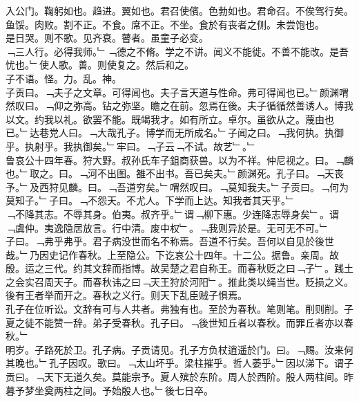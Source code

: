 \documentclass{zhvt-classic}
\begin{document}
\hspace*{2em}入公门。鞠躬如也。趋进。翼如也。君召使儐。色勃如也。君命召。不俟驾行矣。\\
\hspace*{2em}鱼馁。肉败。割不正。不食。席不正。不坐。食於有丧者之侧。未尝饱也。\\
\hspace*{2em}是日哭。则不歌。见齐衰。瞽者。虽童子必变。\\
\hspace*{2em}﹁三人行。必得我师。﹂﹁德之不脩。学之不讲。闻义不能徙。不善不能改。是吾忧也。﹂使人歌。善。则使复之。然后和之。\\
\hspace*{2em}子不语。怪。力。乱。神。\\
\hspace*{2em}子贡曰。﹁夫子之文章。可得闻也。夫子言天道与性命。弗可得闻也已。﹂颜渊喟然叹曰。﹁仰之弥高。钻之弥坚。瞻之在前。忽焉在後。夫子循循然善诱人。博我以文。约我以礼。欲罢不能。既竭我才。如有所立。卓尔。虽欲从之。蔑由也已。﹂达巷党人曰。﹁大哉孔子。博学而无所成名。﹂子闻之曰。﹁我何执。执御乎。执射乎。我执御矣。﹂牢曰。﹁子云﹁不试。故艺﹂。﹂\\
\hspace*{2em}鲁哀公十四年春。狩大野。叔孙氏车子鉏商获兽。以为不祥。仲尼视之。曰。﹁麟也。﹂取之。曰。﹁河不出图。雒不出书。吾已矣夫。﹂颜渊死。孔子曰。﹁天丧予。﹂及西狩见麟。曰。﹁吾道穷矣。﹂喟然叹曰。﹁莫知我夫。﹂子贡曰。﹁何为莫知子。﹂子曰。﹁不怨天。不尤人。下学而上达。知我者其天乎。﹂\\
\hspace*{2em}﹁不降其志。不辱其身。伯夷。叔齐乎。﹂谓﹁柳下惠。少连降志辱身矣﹂。谓﹁虞仲。夷逸隐居放言。行中清。废中权﹂。﹁我则异於是。无可无不可。﹂\\
\hspace*{2em}子曰。﹁弗乎弗乎。君子病没世而名不称焉。吾道不行矣。吾何以自见於後世哉。﹂乃因史记作春秋。上至隐公。下讫哀公十四年。十二公。据鲁。亲周。故殷。运之三代。约其文辞而指博。故吴楚之君自称王。而春秋贬之曰﹁子﹂。践土之会实召周天子。而春秋讳之曰﹁天王狩於河阳﹂。推此类以绳当世。贬损之义。後有王者举而开之。春秋之义行。则天下乱臣贼子惧焉。\\
\hspace*{2em}孔子在位听讼。文辞有可与人共者。弗独有也。至於为春秋。笔则笔。削则削。子夏之徒不能赞一辞。弟子受春秋。孔子曰。﹁後世知丘者以春秋。而罪丘者亦以春秋。﹂\\
\hspace*{2em}明岁。子路死於卫。孔子病。子贡请见。孔子方负杖逍遥於门。曰。﹁赐。汝来何其晚也。﹂孔子因叹。歌曰。﹁太山坏乎。梁柱摧乎。哲人萎乎。﹂因以涕下。谓子贡曰。﹁天下无道久矣。莫能宗予。夏人殡於东阶。周人於西阶。殷人两柱间。昨暮予梦坐奠两柱之间。予始殷人也。﹂後七日卒。\\
\end{document}
